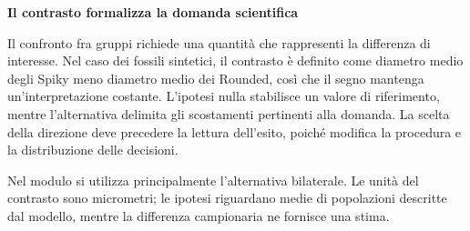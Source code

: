 \documentclass[12pt,aspectratio=1610]{beamer}
\begin{document}
\begin{frame}[plain]
\end{frame}
\begin{lrbox}{\TitleBox}\begin{minipage}[t]{18.2cm}\raggedright\sloppy\color{Ink}\fontsize{20.7}{24}\selectfont \bfseries\color{Navy}Il contrasto formalizza la domanda scientifica\end{minipage}\end{lrbox}
\begin{lrbox}{\BodyBox}\begin{minipage}[t]{10.25cm}\raggedright\sloppy\color{Ink}\fontsize{12.4}{16.4}\selectfont Il confronto fra gruppi richiede una quantità che rappresenti la differenza di interesse. Nel caso dei fossili sintetici, il contrasto è definito come diametro medio degli Spiky meno diametro medio dei Rounded, così che il segno mantenga un’interpretazione costante. L’ipotesi nulla stabilisce un valore di riferimento, mentre l’alternativa delimita gli scostamenti pertinenti alla domanda. La scelta della direzione deve precedere la lettura dell’esito, poiché modifica la procedura e la distribuzione delle decisioni.\par{}\end{minipage}\end{lrbox}
\begin{lrbox}{\SideBox}\begin{minipage}[t]{7.45cm}\raggedright\sloppy\color{Ink}\fontsize{12.2}{16.1}\selectfont Nel modulo si utilizza principalmente l’alternativa bilaterale. Le unità del contrasto sono micrometri; le ipotesi riguardano medie di popolazioni descritte dal modello, mentre la differenza campionaria ne fornisce una stima.\end{minipage}\end{lrbox}
\end{document}
